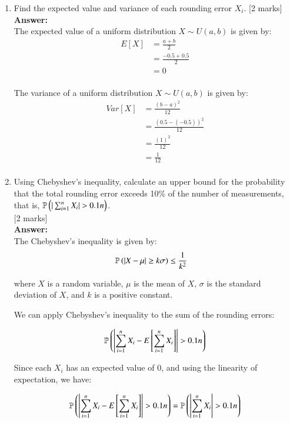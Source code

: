 \documentclass[12pt]{article}
\begin{document}
\begin{enumerate}
\begin{enumerate}
\item Find the expected value and variance of each rounding error $X_i$.
			\hfill [2 marks]
%
\\
\textbf{Answer:}
\\
The expected value of a uniform distribution $X \sim U(a, b)$ is given by:
\begin{align*}
E[X] &= \frac{a + b}{2} \\
&= \frac{-0.5 + 0.5}{2} \\
&= 0 \\
\end{align*}

The variance of a uniform distribution $X \sim U(a, b)$ is given by:
\begin{align*}
Var[X] &= \frac{(b - a)^2}{12} \\
&= \frac{(0.5 - (-0.5))^2}{12} \\
&= \frac{(1)^2}{12} \\
&= \frac{1}{12} \\
\end{align*}
%

\item Using Chebyshev's inequality, calculate an upper bound for the probability that the total rounding error exceeds 10\% of the number of measurements, that is, ${\mathbb P}\left(|\sum_{i=1}^n X_i| > 0.1 n\right)$. 
			\\\phantom{1}\hfill [2 marks]
%
\\
\textbf{Answer:}
\\
The Chebyshev's inequality is given by:
\begin{align*}
{\mathbb P}\left(|X - \mu| \geq k\sigma\right) &\leq \frac{1}{k^2}
\end{align*}

where $X$ is a random variable, $\mu$ is the mean of $X$, $\sigma$ is the standard deviation of $X$, and $k$ is a positive constant.

We can apply Chebyshev's inequality to the sum of the rounding errors:

\begin{align*}
{\mathbb P}\left(\left|\sum_{i=1}^n X_i - E\left[\sum_{i=1}^n X_i\right]\right| > 0.1 n\right) \\
\end{align*}

Since each $X_i$ has an expected value of $0$, and using the linearity of expectation, we have:

\begin{align*}
{\mathbb P}\left(\left|\sum_{i=1}^n X_i - E\left[\sum_{i=1}^n X_i\right]\right| > 0.1 n\right) &= {\mathbb P}\left(\left|\sum_{i=1}^n X_i\right| > 0.1 n\right) \\
\end{align*}


\end{enumerate}
\end{enumerate}
\end{document}
